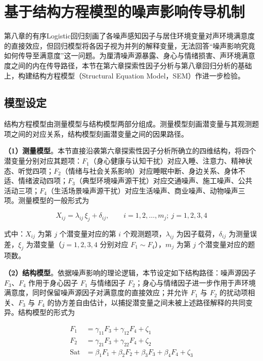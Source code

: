 \section{基于结构方程模型的噪声影响传导机制}

第八章的有序Logistic回归刻画了各噪声感知因子与居住环境变量对声环境满意度的直接效应，但回归模型将各因子视为并列的解释变量，无法回答“噪声影响究竟如何传导至满意度”这一问题。为厘清噪声源暴露、身心与情绪损害、声环境满意度之间的内在传导路径，本节在第六章探索性因子分析与第八章回归分析的基础上，构建结构方程模型（Structural Equation Model，SEM）作进一步检验。

\subsection{模型设定}

结构方程模型由测量模型与结构模型两部分组成。测量模型刻画潜变量与其观测题项之间的对应关系，结构模型刻画潜变量之间的因果路径。

\textbf{（1）测量模型}。本节直接沿袭第六章探索性因子分析所确立的四维结构，将四个潜变量分别对应其题项：$F_1$（身心健康与认知干扰）对应入睡、注意力、精神状态、听觉四项；$F_2$（情绪与社会关系影响）对应睡眠中断、身边关系、身体不适、情绪波动四项；$F_3$（典型环境噪声源干扰）对应交通噪声、施工噪声、公共活动三项；$F_4$（生活场景噪声源干扰）对应生活噪声、商业噪声、动物噪声三项。测量模型的一般形式为

\begin{equation}
X_{ij}=\lambda_{ij}\,\xi_j+\delta_{ij},\qquad i=1,2,\dots,m_j;\ j=1,2,3,4
\end{equation}

式中：$X_{ij}$ 为第 $j$ 个潜变量对应的第 $i$ 个观测题项，$\lambda_{ij}$ 为因子载荷，$\delta_{ij}$ 为测量误差，$\xi_j$ 为潜变量（$j=1,2,3,4$ 分别对应 $F_1\sim F_4$），$m_j$ 为第 $j$ 个潜变量对应的题项数。

\textbf{（2）结构模型}。依据噪声影响的理论逻辑，本节设定如下结构路径：噪声源因子 $F_3$、$F_4$ 作用于身心因子 $F_1$ 与情绪因子 $F_2$；身心与情绪因子进一步作用于声环境满意度，同时保留噪声源因子对满意度的直接效应；并允许 $F_1$ 与 $F_2$ 的扰动项相关、$F_3$ 与 $F_4$ 的协方差自由估计，以捕捉潜变量之间未被上述路径解释的共同变异。结构模型的形式为

\begin{equation}
\begin{aligned}
F_1&=\gamma_{11}F_3+\gamma_{12}F_4+\zeta_1\\
F_2&=\gamma_{21}F_3+\gamma_{22}F_4+\zeta_2\\
\mathrm{Sat}&=\beta_1F_1+\beta_2F_2+\beta_3F_3+\beta_4F_4+\zeta_3
\end{aligned}
\end{equation}

